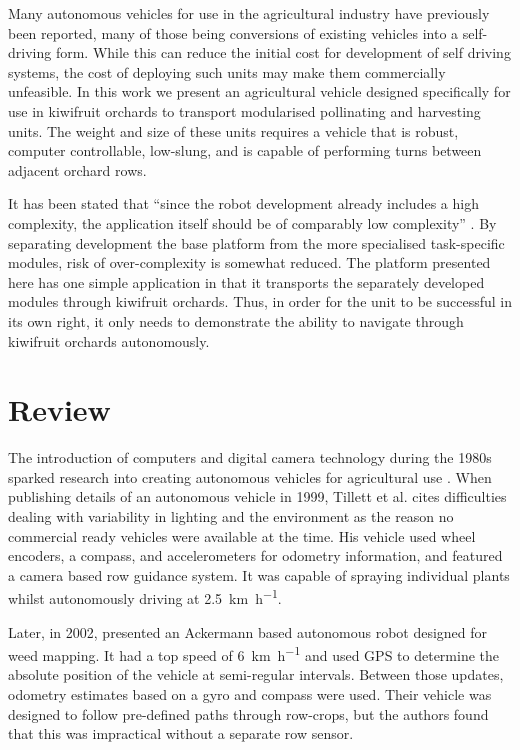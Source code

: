 \documentclass[preprint,authoryear,12pt]{elsarticle}
\begin{document}
    Many autonomous vehicles for use in the agricultural industry have previously been reported, many of those being conversions of existing vehicles into a self-driving form.
    While this can reduce the initial cost for development of self driving systems, the cost of deploying such units may make them commercially unfeasible.
    In this work we present an agricultural vehicle designed specifically for use in kiwifruit orchards to transport modularised pollinating and harvesting units.
    The weight and size of these units requires a vehicle that is robust, computer controllable, low-slung, and is capable of performing turns between adjacent orchard rows.

    It has been stated that ``since the robot development already includes a high complexity, the application itself should be of comparably low complexity'' \citep{Ruckelshausen2009}.
    By separating development the base platform from the more specialised task-specific modules, risk of over-complexity is somewhat reduced.
    The platform presented here has one simple application in that it transports the separately developed modules through kiwifruit orchards.
    Thus, in order for the unit to be successful in its own right, it only needs to demonstrate the ability to navigate through kiwifruit orchards autonomously.

\section{Review}
\label{sect:review}

    The introduction of computers and digital camera technology during the 1980s sparked research into creating autonomous vehicles for agricultural use \cite{Li2009}.
    When publishing details of an autonomous vehicle in 1999, Tillett et al. cites difficulties dealing with variability in lighting and the environment as the reason no commercial ready vehicles were available at the time.
    His vehicle used wheel encoders, a compass, and accelerometers for odometry information, and featured a camera based row guidance system.
    It was capable of spraying individual plants whilst autonomously driving at \SI{2.5}{\kilo\meter\per\hour}.
    
    Later, in 2002, \cite{Pedersen2002} presented an Ackermann based autonomous robot designed for weed mapping.
    It had a top speed of \SI{6}{\kilo\meter\per\hour} and used GPS to determine the absolute position of the vehicle at semi-regular intervals.
    Between those updates, odometry estimates based on a gyro and compass were used.
    Their vehicle was designed to follow pre-defined paths through row-crops, but the authors found that this was impractical without a separate row sensor.
\end{document}
